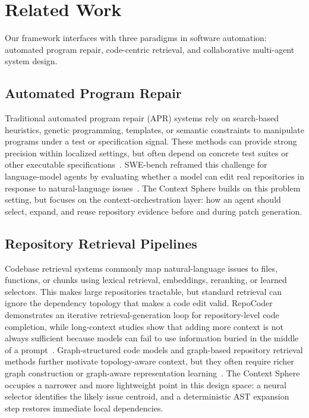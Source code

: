 \section{Related Work}
\label{sec:related_work}

Our framework interfaces with three paradigms in software automation: automated program repair, code-centric retrieval, and collaborative multi-agent system design.

\subsection{Automated Program Repair}

Traditional automated program repair (APR) systems rely on search-based heuristics, genetic programming, templates, or semantic constraints to manipulate programs under a test or specification signal. These methods can provide strong precision within localized settings, but often depend on concrete test suites or other executable specifications~\cite{legoues2019apr}. SWE-bench reframed this challenge for language-model agents by evaluating whether a model can edit real repositories in response to natural-language issues~\cite{jimenez2024swebench}. The Context Sphere builds on this problem setting, but focuses on the context-orchestration layer: how an agent should select, expand, and reuse repository evidence before and during patch generation.

\subsection{Repository Retrieval Pipelines}

Codebase retrieval systems commonly map natural-language issues to files, functions, or chunks using lexical retrieval, embeddings, reranking, or learned selectors. This makes large repositories tractable, but standard retrieval can ignore the dependency topology that makes a code edit valid. RepoCoder demonstrates an iterative retrieval-generation loop for repository-level code completion, while long-context studies show that adding more context is not always sufficient because models can fail to use information buried in the middle of a prompt~\cite{zhang2023repocoder,liu2024lost}. Graph-structured code models and graph-based repository retrieval methods further motivate topology-aware context, but they often require richer graph construction or graph-aware representation learning~\cite{guo2021graphcodebert,liu2024graphcoder}. The Context Sphere occupies a narrower and more lightweight point in this design space: a neural selector identifies the likely issue centroid, and a deterministic AST expansion step restores immediate local dependencies.

